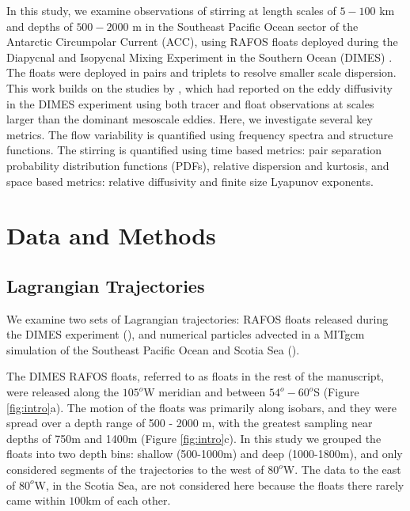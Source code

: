 \documentclass[]{ametsoc}
\begin{document}
In this study, we examine observations of stirring at length scales of $5-100$ km and depths of $500-2000$ m in the Southeast Pacific Ocean sector of the Antarctic Circumpolar Current (ACC), using RAFOS floats deployed during the Diapycnal and Isopycnal Mixing Experiment in the Southern Ocean (DIMES) \citep{balwada2016}. The floats were deployed in pairs and triplets to resolve smaller scale dispersion. This work builds on the studies by \citet{tulloch2014direct, lacasce2014, balwada2016}, which had reported on the eddy diffusivity in the DIMES experiment using both tracer and float observations at scales larger than the dominant mesoscale eddies. Here, we investigate several key metrics. The flow variability is quantified using frequency spectra and structure functions. The stirring is quantified using time based metrics: pair separation probability distribution functions (PDFs), relative dispersion and kurtosis, and space based metrics:  relative diffusivity and finite size Lyapunov exponents.

\section{Data and Methods}
\subsection{Lagrangian Trajectories}
We examine two sets of Lagrangian trajectories: RAFOS floats released during the DIMES experiment (\cite{balwada2016}), and numerical particles advected in a MITgcm simulation of the Southeast Pacific Ocean and Scotia Sea  (\cite{lacasce2014}). 

The DIMES RAFOS floats, referred to as floats in the rest of the manuscript, were released along the $105^o$W meridian and between $54^o - 60^o$S (Figure \ref{fig:intro}a). The motion of the floats was primarily along isobars, and they were spread over a depth range of 500 - 2000 m, with the greatest sampling near depths of 750m and 1400m (Figure \ref{fig:intro}c). In this study we grouped the floats into two depth bins: shallow (500-1000m) and deep (1000-1800m), and only considered segments of the trajectories to the west of $80^o$W. The data to the east of $80^o$W, in the Scotia Sea, are not considered here because the floats there rarely came within $100$km of each other.
\end{document}
